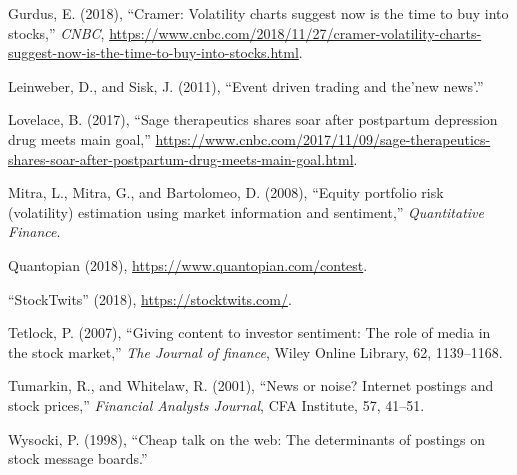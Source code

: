 \documentclass[11,]{article}
\begin{document}
\leavevmode\hypertarget{ref-cramer2018}{}%
Gurdus, E. (2018), ``Cramer: Volatility charts suggest now is the time
to buy into stocks,'' \emph{CNBC},
\url{https://www.cnbc.com/2018/11/27/cramer-volatility-charts-suggest-now-is-the-time-to-buy-into-stocks.html}.

\leavevmode\hypertarget{ref-leinweber2011}{}%
Leinweber, D., and Sisk, J. (2011), ``Event driven trading and the'new
news'.''

\leavevmode\hypertarget{ref-sage2}{}%
Lovelace, B. (2017), ``Sage therapeutics shares soar after postpartum
depression drug meets main goal,''
\url{https://www.cnbc.com/2017/11/09/sage-therapeutics-shares-soar-after-postpartum-drug-meets-main-goal.html}.

\leavevmode\hypertarget{ref-mitra2008}{}%
Mitra, L., Mitra, G., and Bartolomeo, D. (2008), ``Equity portfolio risk
(volatility) estimation using market information and sentiment,''
\emph{Quantitative Finance}.

\leavevmode\hypertarget{ref-q}{}%
Quantopian (2018), \url{https://www.quantopian.com/contest}.

\leavevmode\hypertarget{ref-st}{}%
``StockTwits'' (2018), \url{https://stocktwits.com/}.

\leavevmode\hypertarget{ref-tetlock2007}{}%
Tetlock, P. (2007), ``Giving content to investor sentiment: The role of
media in the stock market,'' \emph{The Journal of finance}, Wiley Online
Library, 62, 1139--1168.

\leavevmode\hypertarget{ref-tumarkin2001}{}%
Tumarkin, R., and Whitelaw, R. (2001), ``News or noise? Internet
postings and stock prices,'' \emph{Financial Analysts Journal}, CFA
Institute, 57, 41--51.

\leavevmode\hypertarget{ref-wysocki1998}{}%
Wysocki, P. (1998), ``Cheap talk on the web: The determinants of
postings on stock message boards.''
\end{document}
